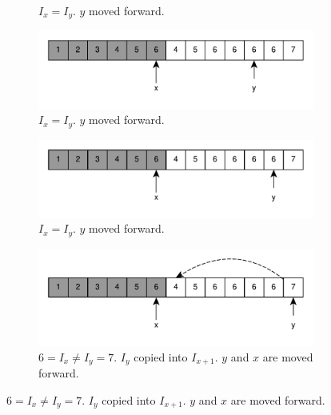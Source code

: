 \begin{figure}
\begin{subfigure}[t]{0.49\textwidth}
		\caption{$I_x = I_y$. $y$ moved forward.}
		\label{fig:remove_duplicated_sorted_array_inplace:example1_6}
	 \end{subfigure}
	 \hfill
	 \begin{subfigure}[t]{0.49\textwidth}
		\includegraphics[width=1\linewidth]{sources/remove_duplicated_sorted_array_inplace/images/example1_12}
		\caption{$I_x = I_y$. $y$ moved forward.}
		\label{fig:remove_duplicated_sorted_array_inplace:example1_6}
	 \end{subfigure}
	 \hfill
	 \begin{subfigure}[t]{0.49\textwidth}
		\includegraphics[width=1\linewidth]{sources/remove_duplicated_sorted_array_inplace/images/example1_13}
		\vspace*{-8mm}
		\caption{$I_x = I_y$. $y$ moved forward.}
		\label{fig:remove_duplicated_sorted_array_inplace:example1_6}
	 \end{subfigure}
	 \hfill
	 \begin{subfigure}[t]{0.49\textwidth}
		\includegraphics[width=1\linewidth]{sources/remove_duplicated_sorted_array_inplace/images/example1_14}
		\vspace*{-8mm}
		\caption{$6 = I_x \neq I_y = 7$. $I_y$ copied into $I_{x+1}$. $y$ and $x$ are moved forward.}
		\label{fig:remove_duplicated_sorted_array_inplace:example1_6}

\end{subfigure}
\end{figure}
